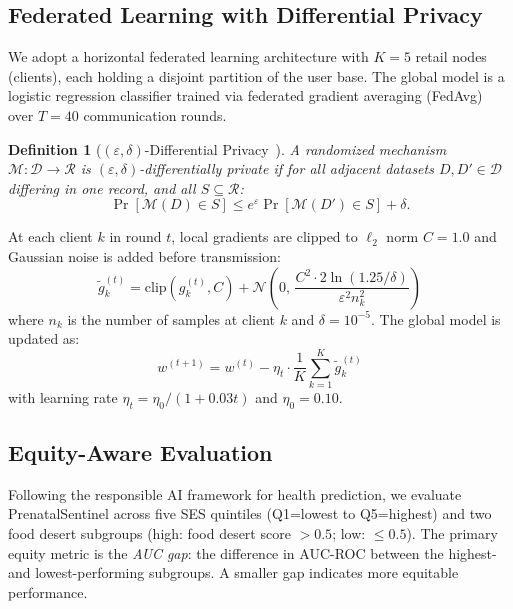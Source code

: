 \documentclass[journal]{IEEEtran}
\newtheorem{definition}{Definition}
\newcommand{\eps}{\varepsilon}
\begin{document}
\subsection{Federated Learning with Differential Privacy}

We adopt a horizontal federated learning architecture with $K=5$
retail nodes (clients), each holding a disjoint partition of the
user base. The global model is a logistic regression classifier
trained via federated gradient averaging (FedAvg)~\cite{mcmahan2017communication}
over $T=40$ communication rounds.

\begin{definition}[$(\eps,\delta)$-Differential Privacy~\cite{dwork2014algorithmic}]
A randomized mechanism $\mathcal{M}: \mathcal{D} \rightarrow \mathcal{R}$
is $(\eps,\delta)$-differentially private if for all adjacent datasets
$D, D' \in \mathcal{D}$ differing in one record, and all $S \subseteq \mathcal{R}$:
\[
\Pr[\mathcal{M}(D) \in S] \leq e^\eps \Pr[\mathcal{M}(D') \in S] + \delta.
\]
\end{definition}

At each client $k$ in round $t$, local gradients are clipped to
$\ell_2$ norm $C=1.0$ and Gaussian noise is added before transmission:
\begin{equation}
\tilde{g}_k^{(t)} = \text{clip}(g_k^{(t)}, C) + \mathcal{N}\!\left(0,\, \frac{C^2 \cdot 2\ln(1.25/\delta)}{\eps^2 n_k^2}\right)
\label{eq:dp_noise}
\end{equation}
where $n_k$ is the number of samples at client $k$ and $\delta=10^{-5}$.
The global model is updated as:
\begin{equation}
w^{(t+1)} = w^{(t)} - \eta_t \cdot \frac{1}{K}\sum_{k=1}^{K} \tilde{g}_k^{(t)}
\label{eq:fedavg}
\end{equation}
with learning rate $\eta_t = \eta_0 / (1 + 0.03t)$ and $\eta_0=0.10$.

\subsection{Equity-Aware Evaluation}

Following the responsible AI framework for health prediction, we
evaluate PrenatalSentinel across five SES quintiles (Q1=lowest to
Q5=highest) and two food desert subgroups (high: food desert score
$>0.5$; low: $\leq 0.5$). The primary equity metric is the
\textit{AUC gap}: the difference in AUC-ROC between the highest-
and lowest-performing subgroups. A smaller gap indicates more
equitable performance.
\end{document}
